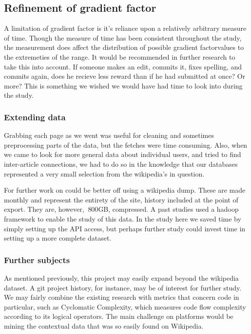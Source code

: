 \subsection*{Refinement of gradient factor}
A limitation of gradient factor is it's reliance upon a relatively
arbitrary measure of time. Though the measure of time has been
consistent throughout the study, the measurement does affect the
distribution of possible gradient factorvalues to the extremeties of
the range. It would be recommended in further research to take this
into account. If someone makes an edit, commits it, fixes spelling,
and commits again, does he recieve less reward than if he had
submitted at once? Or more? This is something we wished we would have
had time to look into during the study.

\subsubsection*{Extending data}
Grabbing each page as we went was useful for cleaning and sometimes
preprocessing parts of the data, but the fetches were time
consuming. Also, when we came to look for more general data about
individual users, and tried to find inter-article connections, we had
to do so in the knowledge that our databases represented a very small
selection from the wikipedia's in question.

For further work on could be better off using a wikipedia dump. These
are made monthly and represent the entirety of the site, history
included at the point of export. They are, however, $~800$GB,
compressed.\cite{wiki-dump} A past studies used a hadoop framework
to enable the study of this data. In the study here we saved time by
simply setting up the API access, but perhaps further study could
invest time in setting up a more complete dataset.

\subsubsection*{Further subjects}
As mentioned previously, this project may easily expand beyond the
wikipedia dataset. A git project history, for instance, may be of
interest for further study. We may fairly combine the existing
research with metrics that concern code in particular, such as
Cyclomatic Complexity, which measures code flow complexity according
to its logical operators.\cite{McCabe1976} The main challenge on
platforms would be mining the contextual data that was so easily found
on Wikipedia.
